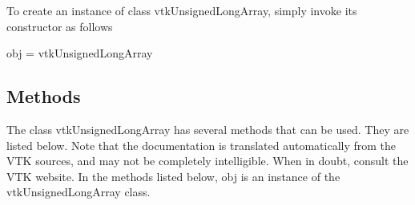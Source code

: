 To create an instance of class vtk\-Unsigned\-Long\-Array, simply invoke its constructor as follows \begin{DoxyVerb}  obj = vtkUnsignedLongArray
\end{DoxyVerb}
 \hypertarget{vtkwidgets_vtkxyplotwidget_Methods}{}\subsection{Methods}\label{vtkwidgets_vtkxyplotwidget_Methods}
The class vtk\-Unsigned\-Long\-Array has several methods that can be used. They are listed below. Note that the documentation is translated automatically from the V\-T\-K sources, and may not be completely intelligible. When in doubt, consult the V\-T\-K website. In the methods listed below, {\ttfamily obj} is an instance of the vtk\-Unsigned\-Long\-Array class. 
